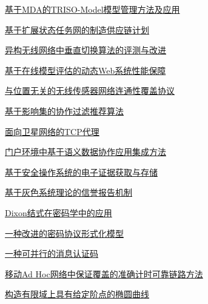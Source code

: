 \documentclass[a4paper]{article}
\begin{document}
\href{http://www.jos.org.cn/ch/reader/download_pdf.aspx?file_no=20070707&year_id=2007&quarter_id=7&falg=1}{基于MDA的TRISO-Model模型管理方法及应用}

\href{http://www.jos.org.cn/ch/reader/download_pdf.aspx?file_no=20070708&year_id=2007&quarter_id=7&falg=1}{基于扩展状态任务网的制造供应链计划}

\href{http://www.jos.org.cn/ch/reader/download_pdf.aspx?file_no=20070710&year_id=2007&quarter_id=7&falg=1}{异构无线网络中垂直切换算法的评测与改进}

\href{http://www.jos.org.cn/ch/reader/download_pdf.aspx?file_no=20070711&year_id=2007&quarter_id=7&falg=1}{基于在线模型评估的动态Web系统性能保障}

\href{http://www.jos.org.cn/ch/reader/download_pdf.aspx?file_no=20070712&year_id=2007&quarter_id=7&falg=1}{与位置无关的无线传感器网络连通性覆盖协议}

\href{http://www.jos.org.cn/ch/reader/download_pdf.aspx?file_no=20070713&year_id=2007&quarter_id=7&falg=1}{基于影响集的协作过滤推荐算法}

\href{http://www.jos.org.cn/ch/reader/download_pdf.aspx?file_no=20070714&year_id=2007&quarter_id=7&falg=1}{面向卫星网络的TCP代理}

\href{http://www.jos.org.cn/ch/reader/download_pdf.aspx?file_no=20070715&year_id=2007&quarter_id=7&falg=1}{门户环境中基于语义数据协作应用集成方法}

\href{http://www.jos.org.cn/ch/reader/download_pdf.aspx?file_no=20070716&year_id=2007&quarter_id=7&falg=1}{基于安全操作系统的电子证据获取与存储}

\href{http://www.jos.org.cn/ch/reader/download_pdf.aspx?file_no=20070717&year_id=2007&quarter_id=7&falg=1}{基于灰色系统理论的信誉报告机制}

\href{http://www.jos.org.cn/ch/reader/download_pdf.aspx?file_no=20070718&year_id=2007&quarter_id=7&falg=1}{Dixon结式在密码学中的应用}

\href{http://www.jos.org.cn/ch/reader/download_pdf.aspx?file_no=20070719&year_id=2007&quarter_id=7&falg=1}{一种改进的密码协议形式化模型}

\href{http://www.jos.org.cn/ch/reader/download_pdf.aspx?file_no=20070720&year_id=2007&quarter_id=7&falg=1}{一种可并行的消息认证码}

\href{http://www.jos.org.cn/ch/reader/download_pdf.aspx?file_no=20070721&year_id=2007&quarter_id=7&falg=1}{移动Ad Hoc网络中保证覆盖的准确计时可靠链路方法}

\href{http://www.jos.org.cn/ch/reader/download_pdf.aspx?file_no=20070722&year_id=2007&quarter_id=7&falg=1}{构造有限域上具有给定阶点的椭圆曲线}
\end{document}
